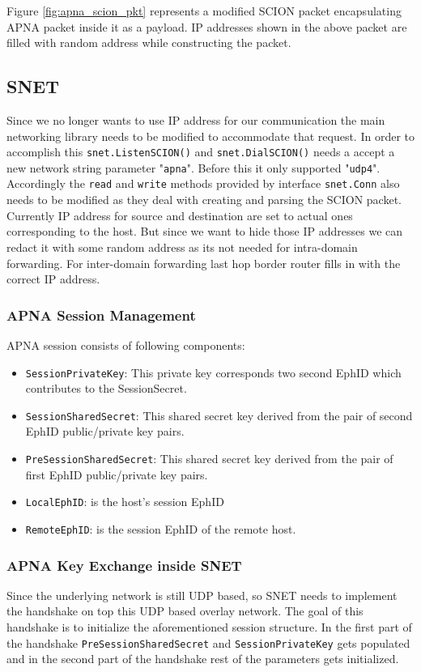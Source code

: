 Figure \ref{fig:apna_scion_pkt} represents a modified SCION packet encapsulating APNA packet inside it as a payload. IP addresses shown in the above packet are filled with random address while constructing the packet.

\subsection{SNET} \label{overlay:snet}
Since we no longer wants to use IP address for our communication the main networking library needs to be modified to accommodate that request. In order to accomplish this \texttt{snet.ListenSCION()} and \texttt{snet.DialSCION()} needs a accept a new network string parameter "\texttt{apna}". Before this it only supported "\texttt{udp4}". Accordingly the \texttt{read} and \texttt{write} methods provided by interface \texttt{snet.Conn} also needs to be modified as they deal with creating and parsing the SCION packet. Currently IP address for source and destination are set to actual ones corresponding to the host. But since we want to hide those IP addresses we can redact it with some random address as its not needed for intra-domain forwarding. For inter-domain forwarding last hop border router fills in with the correct IP address.

\subsubsection{APNA Session Management}
APNA session consists of following components:
\begin{itemize}
    \item \texttt{SessionPrivateKey}:  This private key corresponds two second EphID which contributes to the SessionSecret.
    \item \texttt{SessionSharedSecret}: This shared secret key derived from the pair of second EphID public/private key pairs.
    \item \texttt{PreSessionSharedSecret}: This shared secret key derived from the pair of first EphID public/private key pairs.
    \item \texttt{LocalEphID}: is the host's session EphID
    \item \texttt{RemoteEphID}: is the session EphID of the remote host.
\end{itemize}

\subsubsection{APNA Key Exchange inside SNET}
Since the underlying network is still UDP based, so SNET needs to implement the handshake on top this UDP based overlay network. The goal of this handshake is to initialize the aforementioned session structure. In the first part of the handshake \texttt{PreSessionSharedSecret} and  \texttt{SessionPrivateKey} gets populated and in the second part of the handshake rest of the parameters gets initialized.

